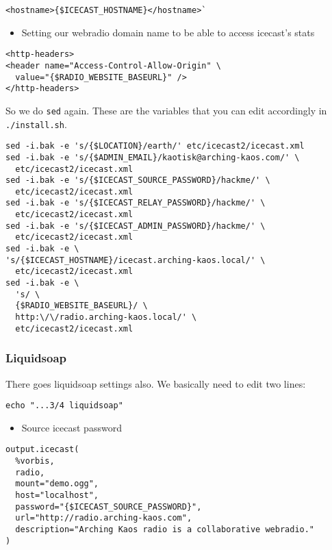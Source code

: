 \documentclass[12pt]{report}
\begin{document}
\begin{verbatim}
<hostname>{$ICECAST_HOSTNAME}</hostname>`
\end{verbatim}

\begin{itemize}

\item
  Setting our webradio domain name to be able to access icecast's stats
\end{itemize}

\begin{verbatim}
<http-headers>
<header name="Access-Control-Allow-Origin" \
  value="{$RADIO_WEBSITE_BASEURL}" />
</http-headers>
\end{verbatim}

So we do \texttt{sed} again. These are the variables that you can edit accordingly in \texttt{./install.sh}.

\begin{verbatim}
sed -i.bak -e 's/{$LOCATION}/earth/' etc/icecast2/icecast.xml
sed -i.bak -e 's/{$ADMIN_EMAIL}/kaotisk@arching-kaos.com/' \
  etc/icecast2/icecast.xml
sed -i.bak -e 's/{$ICECAST_SOURCE_PASSWORD}/hackme/' \
  etc/icecast2/icecast.xml
sed -i.bak -e 's/{$ICECAST_RELAY_PASSWORD}/hackme/' \
  etc/icecast2/icecast.xml
sed -i.bak -e 's/{$ICECAST_ADMIN_PASSWORD}/hackme/' \
  etc/icecast2/icecast.xml
sed -i.bak -e \
's/{$ICECAST_HOSTNAME}/icecast.arching-kaos.local/' \
  etc/icecast2/icecast.xml
sed -i.bak -e \
  's/ \
  {$RADIO_WEBSITE_BASEURL}/ \
  http:\/\/radio.arching-kaos.local/' \
  etc/icecast2/icecast.xml
\end{verbatim}


\subsubsection{Liquidsoap}\label{liquidsoap}

There goes liquidsoap settings also. We basically need to edit two lines:

\begin{verbatim}
echo "...3/4 liquidsoap"
\end{verbatim}

\begin{itemize}

\item
  Source icecast password
\end{itemize}

\begin{verbatim}
output.icecast(
  %vorbis,
  radio,
  mount="demo.ogg",
  host="localhost",
  password="{$ICECAST_SOURCE_PASSWORD}",
  url="http://radio.arching-kaos.com",
  description="Arching Kaos radio is a collaborative webradio."
)
\end{verbatim}
\end{document}

